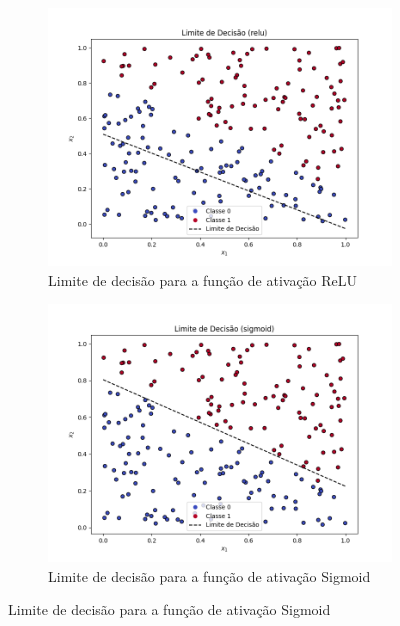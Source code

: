 \documentclass[12 pt]{article}
\begin{document}
\begin{enumerate}
    \begin{figure}[H]
        \centering
        \caption{Limites de decisão para diferentes funções de ativação}
        \begin{subfigure}[b]{0.45\textwidth}
            \centering
            \includegraphics[width=1.2\textwidth]{fig/boundary_relu.png}
            \caption{Limite de decisão para a função de ativação ReLU}
            \label{fig:boundary_relu}
        \end{subfigure}
        \hfill
        \begin{subfigure}[b]{0.45\textwidth}
            \centering
            \includegraphics[width=1.2\textwidth]{fig/boundary_sigmoid.png}
            \caption{Limite de decisão para a função de ativação Sigmoid}
            \label{fig:boundary_sigmoid}
        \end{subfigure}
        \label{fig:decision_boundaries}
    \end{figure}


\end{enumerate}
\end{document}
